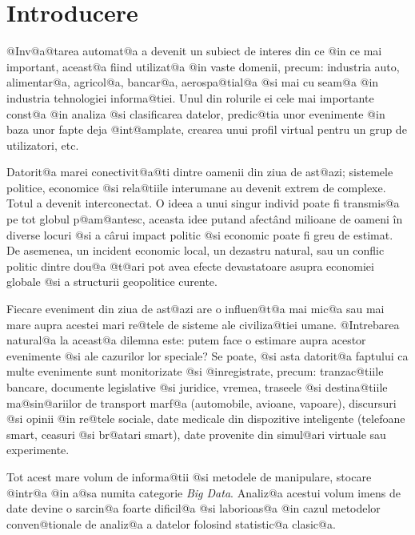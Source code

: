 

\chapter*{Introducere}
\label{capintro}

@Inv@a@tarea automat@a a devenit un subiect de interes din ce @in ce mai important, aceast@a fiind utilizat@a @in vaste domenii, precum: industria auto, alimentar@a, agricol@a, bancar@a, aerospa@tial@a @si mai cu seam@a @in industria tehnologiei informa@tiei. Unul din rolurile ei cele mai importante const@a @in analiza @si clasificarea datelor, predic@tia unor evenimente @in baza unor fapte deja @int@amplate, crearea unui profil virtual pentru un grup de utilizatori, etc.


Datorit@a marei conectivit@a@ti dintre oamenii din ziua de ast@azi; sistemele politice, economice @si rela@tiile interumane au devenit extrem de complexe. Totul a devenit interconectat. O ideea a unui singur individ poate fi transmis@a pe tot globul p@am@antesc, aceasta idee putand afect\^ and milioane de oameni \^ in diverse locuri @si a c\^ arui impact politic @si economic poate fi greu de estimat. De asemenea, un incident economic local, un dezastru natural, sau un conflic politic dintre dou@a @t@ari pot avea efecte devastatoare asupra economiei globale @si a structurii geopolitice curente.

Fiecare eveniment din ziua de ast@azi are o influen@t@a mai mic@a sau mai mare aupra acestei mari re@tele de sisteme ale civiliza@tiei umane. @Intrebarea natural@a la aceast@a dilemna este: putem face o estimare aupra acestor evenimente @si ale cazurilor lor speciale? Se poate, @si asta datorit@a faptului ca multe evenimente sunt monitorizate @si @inregistrate, precum: tranzac@tiile bancare, documente legislative @si juridice, vremea, traseele @si destina@tiile ma@sin@ariilor de transport marf@a (automobile, avioane, vapoare), discursuri @si opinii @in re@tele sociale, date medicale din dispozitive inteligente (telefoane smart, ceasuri @si br@atari smart), date provenite din simul@ari virtuale sau experimente. 

Tot acest mare volum de informa@tii @si metodele de manipulare, stocare @intr@a @in a@sa numita categorie {\sl Big Data}. Analiz@a acestui volum imens de date devine o sarcin@a foarte dificil@a @si laborioas@a @in cazul metodelor conven@tionale de analiz@a a datelor folosind statistic@a clasic@a. 


